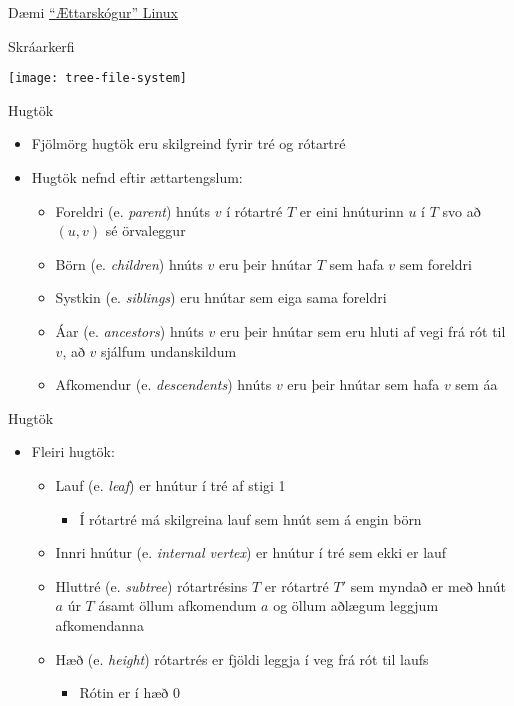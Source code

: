 \documentclass[handout]{beamer}
\begin{document}
\begin{frame}{Dæmi}
\href{https://upload.wikimedia.org/wikipedia/commons/1/1b/Linux_Distribution_Timeline.svg}{``Ættarskógur'' Linux}
\end{frame}

\begin{frame}{Skráarkerfi}
\begin{center}
\texttt{[image: tree-file-system]}
\end{center}
\end{frame}

\begin{frame}{Hugtök}
\begin{itemize}
 \item Fjölmörg hugtök eru skilgreind fyrir tré og rótartré
 \item Hugtök nefnd eftir ættartengslum:
 \begin{itemize}
  \item Foreldri (e. \emph{parent}) hnúts $v$ í rótartré $T$ er eini hnúturinn $u$ í $T$ svo að $(u,v)$ sé örvaleggur
  \item Börn (e. \emph{children}) hnúts $v$ eru þeir hnútar $T$ sem hafa $v$ sem foreldri
  \item Systkin (e. \emph{siblings}) eru hnútar sem eiga sama foreldri
  \item Áar (e. \emph{ancestors}) hnúts $v$ eru þeir hnútar sem eru hluti af vegi frá rót til $v$, að $v$ sjálfum undanskildum
  \item Afkomendur (e. \emph{descendents}) hnúts $v$ eru þeir hnútar sem hafa $v$ sem áa
 \end{itemize}
\end{itemize}
\end{frame}

\begin{frame}{Hugtök}
\begin{itemize}
 \item Fleiri hugtök:
 \begin{itemize}
  \item Lauf (e. \emph{leaf}) er hnútur í tré af stigi 1
  \begin{itemize}
   \item Í rótartré má skilgreina lauf sem hnút sem á engin börn
  \end{itemize}
  \item Innri hnútur (e. \emph{internal vertex}) er hnútur í tré sem ekki er lauf
  \item Hluttré (e. \emph{subtree}) rótartrésins $T$ er rótartré $T'$ sem myndað er með hnút $a$ úr $T$ ásamt öllum afkomendum $a$ og öllum aðlægum leggjum afkomendanna
  \item Hæð (e. \emph{height}) rótartrés er fjöldi leggja í veg frá rót til laufs
  \begin{itemize}
   \item Rótin er í hæð 0
  \end{itemize}
 \end{itemize}
\end{itemize}
\end{frame}
\end{document}
